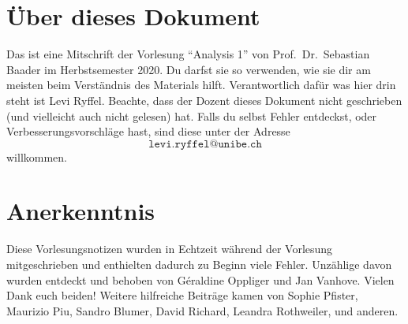 \documentclass[../main.tex]{subfiles}
\begin{document}
\section*{Über dieses Dokument}
Das ist eine Mitschrift
der Vorlesung ``Analysis 1''
von Prof.\ Dr.\ Sebastian Baader
im Herbstsemester 2020.
Du darfst sie so verwenden,
wie sie dir am meisten
beim Verständnis des Materials
hilft.
Verantwortlich dafür was
hier drin steht ist Levi Ryffel.
Beachte, dass der Dozent dieses Dokument
nicht geschrieben (und vielleicht auch nicht gelesen) hat.
Falls du selbst Fehler entdeckst, oder Verbesserungsvorschläge hast,
sind diese unter der Adresse
\[
  \texttt{levi.ryffel@unibe.ch}
\]
willkommen.



\section*{Anerkenntnis}
Diese Vorlesungsnotizen wurden in Echtzeit während der Vorlesung mitgeschrieben
und enthielten dadurch zu Beginn viele Fehler.
Unzählige davon wurden entdeckt und behoben
von Géraldine Oppliger und Jan Vanhove.
Vielen Dank euch beiden! Weitere hilfreiche Beiträge kamen
von Sophie Pfister, Maurizio Piu, Sandro Blumer, David Richard, Leandra Rothweiler, und anderen.
\end{document}
